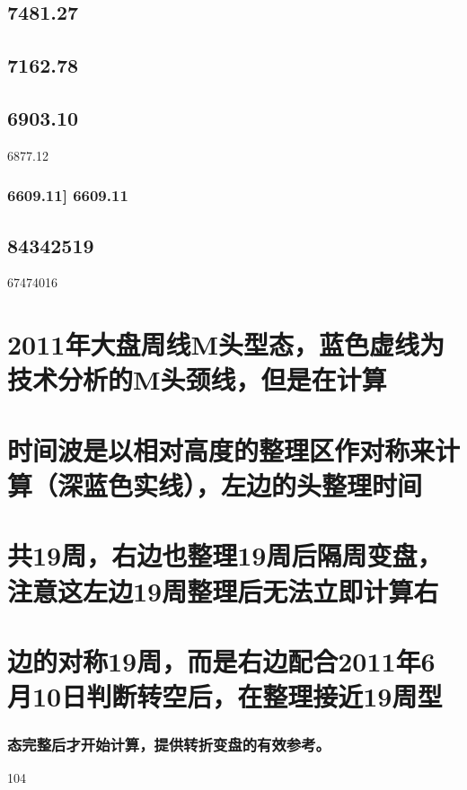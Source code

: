 \documentclass{article}
\begin{document}
\subsection{7481.27}

\subsection{7162.78}

\subsection{6903.10}

6877.12

\subsubsection{6609.11] 6609.11}

\subsection{84342519}

67474016

\section{2011年大盘周线M头型态，蓝色虚线为技术分析的M头颈线，但是在计算}

\section{时间波是以相对高度的整理区作对称来计算（深蓝色实线），左边的头整理时间}

\section{共19周，右边也整理19周后隔周变盘，注意这左边19周整理后无法立即计算右}

\section{边的对称19周，而是右边配合2011年6月10日判断转空后，在整理接近19周型}

\subsubsection{态完整后才开始计算，提供转折变盘的有效参考。}

104
\end{document}
